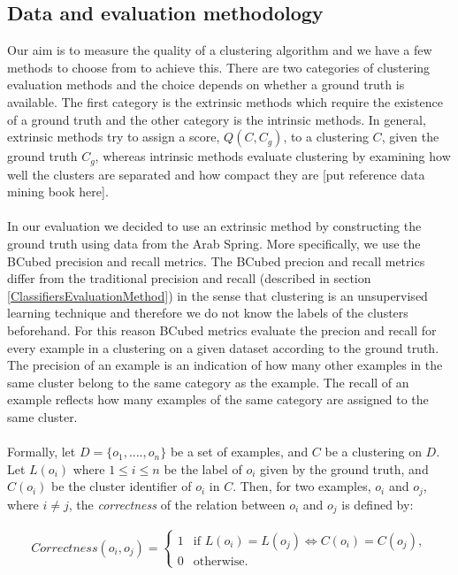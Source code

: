    
\subsection{Data and evaluation methodology}\label{ClusteringEvaluationMethod}
Our aim is to measure the quality of a clustering algorithm and we have a few methods to choose from to achieve this. There are two categories of clustering evaluation methods and the choice depends
on whether a ground truth is available. The first category is the extrinsic methods which require the existence of a ground truth and the other category is the intrinsic methods. In general, extrinsic methods try to assign a score, $Q(C, C_g)$, to a clustering $C$, given the ground truth $C_g$, whereas intrinsic methods evaluate clustering by examining how well the clusters are separated and how compact they are [put reference data mining book here].\\\\ 
In our evaluation we decided to use an extrinsic method by constructing the ground truth using data from the Arab Spring. More specifically, we use the BCubed precision and recall metrics. The BCubed precion and recall metrics differ from the traditional precision and recall (described in section \ref{ClassifiersEvaluationMethod}) in the sense that clustering is an unsupervised learning technique and therefore we do not know the labels of the clusters beforehand. For this reason BCubed metrics evaluate the precion and recall for every example in a clustering on a given dataset according to the ground truth. The precision of an example is an indication of how many other examples in the same cluster belong to the same category as the example. The recall of an example reflects how many examples of the same category are assigned to the same cluster.\\\\ 
Formally, let $D = \{ o_1,....,o_n \}$ be a set of examples, and $C$ be a clustering on $D$. Let $L(o_i)$ where $1 \leq i \leq n$ be the label of $o_i$ given by the ground truth, and $C(o_i)$ be the cluster identifier of $o_i$ in $C$. Then, for two examples, $o_i$ and $o_j$, where $i \neq j$, the \emph{correctness} of the relation between $o_i$ and $o_j$ is defined by:

\begin{eqnarray}
Correctness(o_i, o_j) = \begin{cases}
                          1& \text{if $L(o_i) = L(o_j) \Leftrightarrow C(o_i) = C(o_j) $},\\
                          0& \text{otherwise}.
                        \end{cases}
\end{eqnarray} 

